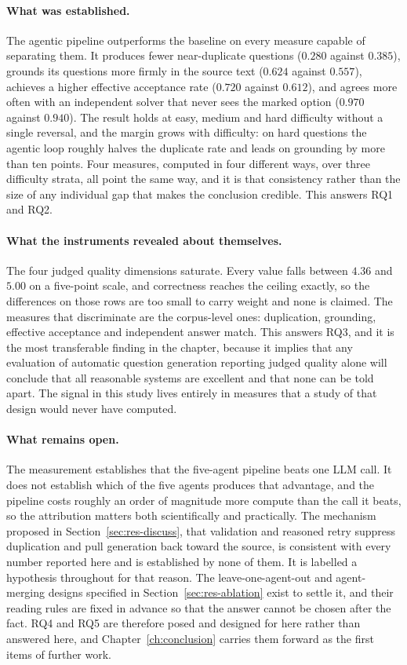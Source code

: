 \paragraph{What was established.} The agentic pipeline outperforms the baseline
on every measure capable of separating them. It produces fewer near-duplicate
questions ($0.280$ against $0.385$), grounds its questions more firmly in the
source text ($0.624$ against $0.557$), achieves a higher effective acceptance
rate ($0.720$ against $0.612$), and agrees more often with an independent solver
that never sees the marked option ($0.970$ against $0.940$). The result holds at
easy, medium and hard difficulty without a single reversal, and the margin grows
with difficulty: on hard questions the agentic loop roughly halves the duplicate
rate and leads on grounding by more than ten points. Four measures, computed in
four different ways, over three difficulty strata, all point the same way, and
it is that consistency rather than the size of any individual gap that makes
the conclusion credible. This answers RQ1 and RQ2.

\paragraph{What the instruments revealed about themselves.} The four judged
quality dimensions saturate. Every value falls between $4.36$ and $5.00$ on a
five-point scale, and correctness reaches the ceiling exactly, so the differences
on those rows are too small to carry weight and none is claimed. The measures
that discriminate are the corpus-level ones: duplication, grounding, effective
acceptance and independent answer match. This answers RQ3, and it is the most
transferable finding in the chapter, because it implies that any evaluation of
automatic question generation reporting judged quality alone will conclude that
all reasonable systems are excellent and that none can be told apart. The signal
in this study lives entirely in measures that a study of that design would never
have computed.

\paragraph{What remains open.} The measurement establishes that the five-agent
pipeline beats one LLM call. It does not establish which of the five agents
produces that advantage, and the pipeline costs roughly an order of magnitude
more compute than the call it beats, so the attribution matters both
scientifically and practically. The mechanism proposed in
Section~\ref{sec:res-discuss}, that validation and reasoned retry suppress
duplication and pull generation back toward the source, is consistent with every
number reported here and is established by none of them. It is labelled a
hypothesis throughout for that reason. The leave-one-agent-out and agent-merging
designs specified in Section~\ref{sec:res-ablation} exist to settle it, and
their reading rules are fixed in advance so that the answer cannot be chosen
after the fact. RQ4 and RQ5 are therefore posed and designed for here rather
than answered here, and Chapter~\ref{ch:conclusion} carries them forward as the
first items of further work.

